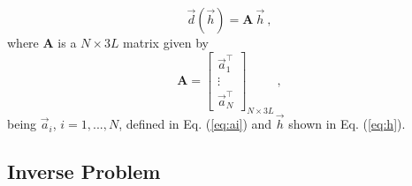 \documentclass[journal abbreviation, npg]{copernicus}
\begin{document}
\begin{equation}
\vec{d}(\vec{h}) = \mathbf{A} \: \vec{h} \: ,
\label{eq:predicted-data-vector}
\end{equation}
where $\mathbf{A}$ is a $N \times 3L$ matrix given by
\begin{equation}
\mathbf{A} =
\left[
\begin{array}{c}
\vec{a}_{1}^{\intercal} \\
\vdots \\
\vec{a}_{N}^{\intercal}
\end{array}
\right]_{N \times 3L} \: ,
\label{eq:sensibility-matrix}
\end{equation}
being $\vec{a}_{i}$, $i = 1, ..., N$, defined in Eq. (\ref{eq:ai}) and $\vec{h}$ shown in Eq. (\ref{eq:h}).

\subsection{Inverse Problem}
\end{document}

